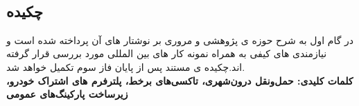 
\setcounter{page}{1}
\thispagestyle{empty}

~\vfill

\subsection*{چکیده}
\begin{small}
\baselineskip=0.7cm


در گام اول به شرح حوزه ی پژوهشی و مروری بر نوشتار های آن پرداخته شده است و نیازمندی های کیفی به همراه نمونه کار های بین المللی مورد بررسی قرار گرفته اند.چکیده ی مستند پس از پایان فاز سوم تکمیل خواهد شد. \\
\noindent\textbf{کلمات کلیدی:
حمل‌و‌نقل درون‌شهری، تاکسی‌های برخط، پلترفرم های اشتراک خودرو، زیرساخت پارکینگ‌های عمومی
}
\end{small}